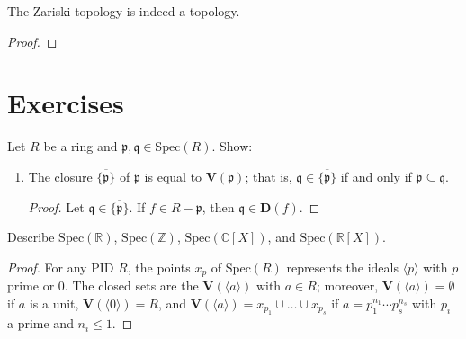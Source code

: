 \begin{prps}
    The Zariski topology is indeed a topology.
\end{prps}
\begin{proof}
    
\end{proof}

\section{Exercises}
\begin{exr}
    Let \(R\) be a ring and \(\mathfrak{p}, \mathfrak{q} \in \mathrm{Spec}(R)\). Show:
    \begin{enumerate}
        \item The closure \(\overline{\{\mathfrak{p}\}}\) of \(\mathfrak{p}\) is equal to \(\mathbf{V}(\mathfrak{p})\); that is, \(\mathfrak{q} \in \overline{\{\mathfrak{p}\}}\) if and only if \(\mathfrak{p} \subseteq \mathfrak{q}\).
        \begin{proof}
            Let \(\mathfrak{q} \in \overline{\{\mathfrak{p}\}}\). If \(f \in R - \mathfrak{p}\), then \(\mathfrak{q} \in \mathbf{D}(f)\).
        \end{proof}
    \end{enumerate}
\end{exr}

\begin{exr}
    Describe \(\mathrm{Spec}(\mathbb{R})\), \(\mathrm{Spec}(\mathbb{Z})\), \(\mathrm{Spec}(\mathbb{C}[X])\), and \(\mathrm{Spec}(\mathbb{R}[X])\).
\end{exr}
\begin{proof}
    For any PID \(R\), the points \(x_p\) of \(\mathrm{Spec}(R)\) represents the ideals \(\langle p \rangle\) with \(p\) prime or \(0\). The closed sets are the \(\mathbf{V}(\langle a \rangle)\) with \(a \in R\); moreover, \(\mathbf{V}(\langle a \rangle) = \emptyset\) if \(a\) is a unit, \(\mathbf{V}(\langle 0 \rangle) = R\), and \(\mathbf{V}(\langle a \rangle) = x_{p_1} \cup \ldots \cup x_{p_s}\) if \(a = p_1^{n_1} \cdots p_s^{n_s}\) with \(p_i\) a prime and \(n_i \leq 1\).
\end{proof}
